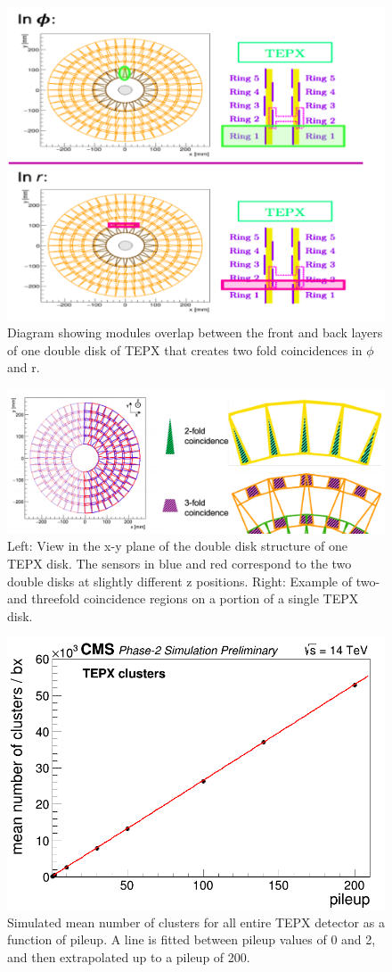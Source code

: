 \begin{figure}[H]
  \centering
  \includegraphics[width=0.8\columnwidth]{./coincidences.png}
  \caption{ \onehalfspacing Diagram showing modules overlap between the front and back layers of one double disk of TEPX that creates two fold coincidences in $\phi$ and r.}
  \label{fig:CMS}
\end{figure}

\begin{figure}[H]
  \centering
  \includegraphics[width=0.8\columnwidth]{./up.png}
  \caption{\onehalfspacing Left: View in the x-y plane of the double disk structure of one TEPX disk. The sensors in blue and red correspond to the two double disks at slightly different z positions. Right: Example of two- and threefold coincidence regions on a portion of a single TEPX disk.}
  \label{fig:CMS}
\end{figure}

\begin{figure}[H]
  \centering
  \includegraphics[width=0.5\columnwidth]{./TEPX_totalcluster_linearity.png}
  \caption{Simulated mean number of clusters for all entire TEPX detector as a function of pileup. A line is fitted between pileup values of 0 and 2, and then extrapolated up to a pileup of 200.}
  \label{fig:CMS}
\end{figure}


